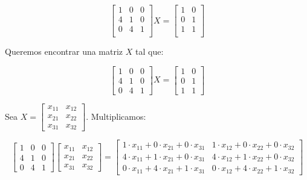 \documentclass[answers]{exam}
\begin{document}
\begin{questions}
    \[
    \begin{bmatrix}
    1 & 0 & 0\\
    4 & 1 & 0\\
    0 & 4 & 1\\
    \end{bmatrix} 
    X = 
    \begin{bmatrix}
    1 & 0\\
    0 & 1\\
    1 & 1\\
    \end{bmatrix}
    \]

    \begin{solution}
        Queremos encontrar una matriz \( X \) tal que:
        
        \[
        \begin{bmatrix}
         1 & 0 & 0\\
         4 & 1 & 0\\
         0 & 4 & 1
        \end{bmatrix} 
        X = 
        \begin{bmatrix}
         1 & 0\\
         0 & 1\\
         1 & 1
        \end{bmatrix}
        \]
        
        Sea \( X = \begin{bmatrix}
         x_{11} & x_{12} \\
         x_{21} & x_{22} \\
         x_{31} & x_{32}
        \end{bmatrix} \). Multiplicamos:
        
        \[
        \begin{bmatrix}
         1 & 0 & 0\\
         4 & 1 & 0\\
         0 & 4 & 1
        \end{bmatrix} 
        \begin{bmatrix}
         x_{11} & x_{12} \\
         x_{21} & x_{22} \\
         x_{31} & x_{32}
        \end{bmatrix} 
        =
        \begin{bmatrix}
         1 \cdot x_{11} + 0 \cdot x_{21} + 0 \cdot x_{31} & 1 \cdot x_{12} + 0 \cdot x_{22} + 0 \cdot x_{32} \\
         4 \cdot x_{11} + 1 \cdot x_{21} + 0 \cdot x_{31} & 4 \cdot x_{12} + 1 \cdot x_{22} + 0 \cdot x_{32} \\
         0 \cdot x_{11} + 4 \cdot x_{21} + 1 \cdot x_{31} & 0 \cdot x_{12} + 4 \cdot x_{22} + 1 \cdot x_{32}
        \end{bmatrix}
        \]
        

\end{solution}
\end{questions}
\end{document}
